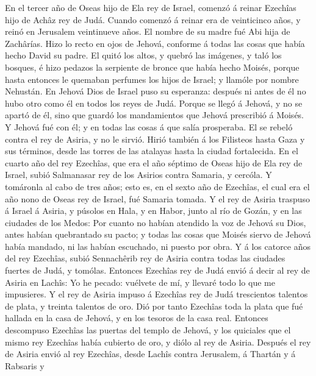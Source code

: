  En el tercer año de Oseas hijo de Ela rey de Israel,
comenzó á reinar Ezechîas hijo de Achâz rey de Judá. 
Cuando comenzó á reinar era de veinticinco años, y reinó en Jerusalem
veintinueve años. El nombre de su madre fué Abi hija de Zachârías.
 Hizo lo recto en ojos de Jehová, conforme á todas las
cosas que había hecho David su padre.  El quitó los altos,
y quebró las imágenes, y taló los bosques, é hizo pedazos la serpiente
de bronce que había hecho Moisés, porque hasta entonces le quemaban
perfumes los hijos de Israel; y llamóle por nombre Nehustán.
 En Jehová Dios de Israel puso su esperanza: después ni
antes de él no hubo otro como él en todos los reyes de Judá.
 Porque se llegó á Jehová, y no se apartó de él, sino que
guardó los mandamientos que Jehová prescribió á Moisés.  Y
Jehová fué con él; y en todas las cosas á que salía prosperaba. El se
rebeló contra el rey de Asiria, y no le sirvió.  Hirió
también á los Filisteos hasta Gaza y sus términos, desde las torres de
las atalayas hasta la ciudad fortalecida.  En el cuarto
año del rey Ezechîas, que era el año séptimo de Oseas hijo de Ela rey de
Israel, subió Salmanasar rey de los Asirios contra Samaria, y cercóla.
 Y tomáronla al cabo de tres años; esto es, en el sexto
año de Ezechîas, el cual era el año nono de Oseas rey de Israel, fué
Samaria tomada.  Y el rey de Asiria traspuso á Israel á
Asiria, y púsolos en Hala, y en Habor, junto al río de Gozán, y en las
ciudades de los Medos:  Por cuanto no habían atendido la
voz de Jehová su Dios, antes habían quebrantado su pacto; y todas las
cosas que Moisés siervo de Jehová había mandado, ni las habían
escuchado, ni puesto por obra.  Y á los catorce años del
rey Ezechîas, subió Sennachêrib rey de Asiria contra todas las ciudades
fuertes de Judá, y tomólas.  Entonces Ezechîas rey de
Judá envió á decir al rey de Asiria en Lachîs: Yo he pecado: vuélvete de
mí, y llevaré todo lo que me impusieres. Y el rey de Asiria impuso á
Ezechîas rey de Judá trescientos talentos de plata, y treinta talentos
de oro.  Dió por tanto Ezechîas toda la plata que fué
hallada en la casa de Jehová, y en los tesoros de la casa real.
 Entonces descompuso Ezechîas las puertas del templo de
Jehová, y los quiciales que el mismo rey Ezechîas había cubierto de oro,
y diólo al rey de Asiria.  Después el rey de Asiria envió
al rey Ezechîas, desde Lachîs contra Jerusalem, á Thartán y á Rabsaris y
